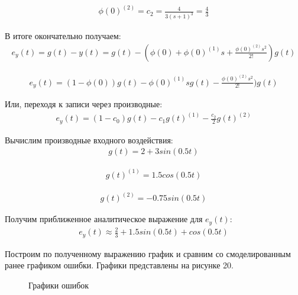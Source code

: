 \documentclass[a4paper, 11pt]{article}
\begin{document}
\begin{align}
\phi(0)^{(2)}=c_2=\displaystyle\frac{4}{3(s+1)^3}=\frac{4}{3}
\end{align} 

\par 
В итоге окончательно получаем:
\begin{align}
\displaystyle e_y(t)=g(t)-y(t)=g(t)-(\phi(0)+\phi(0)^{(1)}s+\frac{\phi(0)^{(2)}s^2}{2!})g(t)
\end{align} 

\begin{align}
\displaystyle e_y(t)=(1-\phi(0))g(t)-\phi(0)^{(1)}sg(t)-\frac{\phi(0)^{(2)}s^2}{2!})g(t)
\end{align}

\par 
Или, переходя к записи через производные:
\begin{align}
\displaystyle e_y(t)=(1-c_0)g(t)-c_1g(t)^{(1)}-\frac{c_2}{2}g(t)^{(2)}
\end{align}

\par 
Вычислим производные входного воздействия:
\begin{align}
\displaystyle g(t)=2+3sin(0.5t)
\end{align} 

\begin{align}
\displaystyle g(t)^{(1)}=1.5cos(0.5t)
\end{align} 

\begin{align}
\displaystyle g(t)^{(2)}=-0.75sin(0.5t)
\end{align} 

\par 

Получим приближенное аналитическое выражение для $e_y(t)$:
\begin{align}
\displaystyle e_y(t)\approx\frac{2}{3}+1.5sin(0.5t)+cos(0.5t)
\end{align}

\par 
Построим по полученному выражению график и сравним со смоделированным ранее графиком ошибки. Графики представлены на рисунке 20.

\newpage
\begin{figure}[h!]
\centering
{}
\caption{Графики ошибок}
\end{figure}
\end{document}
